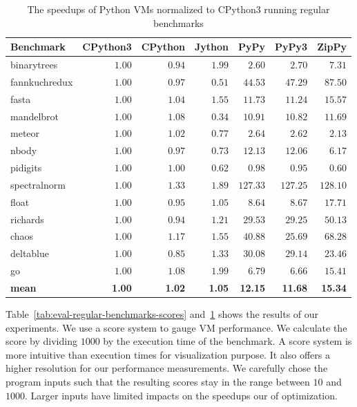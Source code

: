 \begin{table}
  \small
  \begin{center}
  \begin{tabular}{ l r r r r r r }
  \toprule
  Benchmark     & CPython3  & CPython  & Jython  & PyPy     & PyPy3    & ZipPy \\
  \midrule
  \textsf{binarytrees}   & $1.00$    & $0.94$   & $1.99$  & $2.60$   & $2.70$   & $7.31$ \\
  \textsf{fannkuchredux} & $1.00$    & $0.97$   & $0.51$  & $44.53$  & $47.29$  & $87.50$ \\
  \textsf{fasta}         & $1.00$    & $1.04$   & $1.55$  & $11.73$  & $11.24$  & $15.57$ \\
  \textsf{mandelbrot}    & $1.00$    & $1.08$   & $0.34$  & $10.91$  & $10.82$  & $11.69$ \\
  \textsf{meteor}        & $1.00$    & $1.02$   & $0.77$  & $2.64$   & $2.62$   & $2.13$ \\
  \textsf{nbody}         & $1.00$    & $0.97$   & $0.73$  & $12.13$  & $12.06$  & $6.17$ \\
  \textsf{pidigits}      & $1.00$    & $1.00$   & $0.62$  & $0.98$   & $0.95$   & $0.60$ \\
  \textsf{spectralnorm}  & $1.00$    & $1.33$   & $1.89$  & $127.33$ & $127.25$ & $128.10$ \\
  \textsf{float}         & $1.00$    & $0.95$   & $1.05$  & $8.64$   & $8.67$   & $17.71$ \\
  \textsf{richards}      & $1.00$    & $0.94$   & $1.21$  & $29.53$  & $29.25$  & $50.13$ \\
  \textsf{chaos}         & $1.00$    & $1.17$   & $1.55$  & $40.88$  & $25.69$  & $68.28$ \\
  \textsf{deltablue}     & $1.00$    & $0.85$   & $1.33$  & $30.08$  & $29.14$  & $23.46$ \\
  \textsf{go}            & $1.00$    & $1.08$   & $1.99$  & $6.79$   & $6.66$   & $15.41$ \\
  \textbf{mean}          & \textbf{1.00}    & \textbf{1.02}   & \textbf{1.05}  & \textbf{12.15}  & \textbf{11.68}  & \textbf{15.34} \\
  \bottomrule
  \end{tabular}
  \caption{The speedups of Python VMs normalized to CPython3 running regular benchmarks}
  \label{tab:eval-regular-benchmarks-speedups}
  \end{center}
\end{table}

Table~\ref{tab:eval-regular-benchmarks-scores} and~\ref{tab:eval-regular-benchmarks-speedups} shows the results of our experiments.
We use a score system to gauge VM performance.
We calculate the score by dividing $1000$ by the execution time of the benchmark.
A score system is more intuitive than execution times for visualization purpose.
It also offers a higher resolution for our performance measurements.
We carefully chose the program inputs such that the resulting scores stay in the range between $10$ and $1000$.
Larger inputs have limited impacts on the speedups our of optimization.

